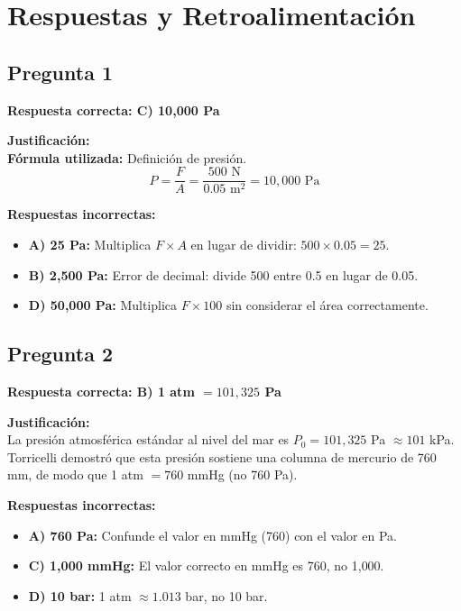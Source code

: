 
\newpage
\onecolumn

\section*{Respuestas y Retroalimentación}

\begin{respuestabox}
\subsection*{Pregunta 1}
\textcolor{verdecorrecto}{\textbf{Respuesta correcta: C) 10{,}000 Pa}}

\textbf{Justificación:}\\
\textbf{Fórmula utilizada:} Definición de presión.
$$P = \frac{F}{A} = \frac{500 \text{ N}}{0.05 \text{ m}^2} = 10{,}000 \text{ Pa}$$

\textbf{Respuestas incorrectas:}
\begin{itemize}
    \item \textbf{A) 25 Pa:} Multiplica $F \times A$ en lugar de dividir: $500 \times 0.05 = 25$.
    \item \textbf{B) 2{,}500 Pa:} Error de decimal: divide 500 entre 0.5 en lugar de 0.05.
    \item \textbf{D) 50{,}000 Pa:} Multiplica $F \times 100$ sin considerar el área correctamente.
\end{itemize}
\end{respuestabox}

\begin{respuestabox}
\subsection*{Pregunta 2}
\textcolor{verdecorrecto}{\textbf{Respuesta correcta: B) 1 atm $= 101{,}325$ Pa}}

\textbf{Justificación:}\\
La presión atmosférica estándar al nivel del mar es $P_0 = 101{,}325$ Pa $\approx 101$ kPa. Torricelli demostró que esta presión sostiene una columna de mercurio de 760 mm, de modo que 1 atm $= 760$ mmHg (no 760 Pa).

\textbf{Respuestas incorrectas:}
\begin{itemize}
    \item \textbf{A) 760 Pa:} Confunde el valor en mmHg (760) con el valor en Pa.
    \item \textbf{C) 1{,}000 mmHg:} El valor correcto en mmHg es 760, no 1{,}000.
    \item \textbf{D) 10 bar:} 1 atm $\approx 1.013$ bar, no 10 bar.
\end{itemize}
\end{respuestabox}

